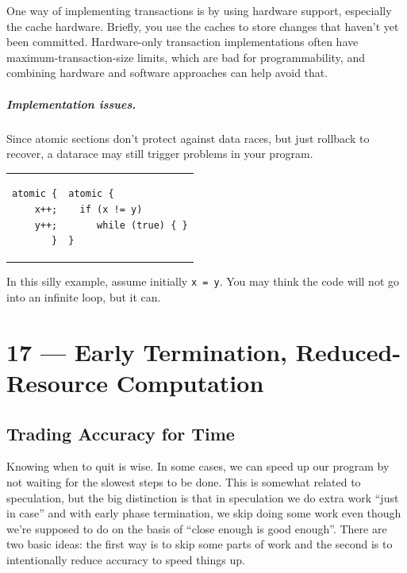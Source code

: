 \documentclass[a4paper]{report}
\begin{document}
One way of implementing transactions is by using hardware support,
especially the cache hardware. Briefly, you use the caches to store
changes that haven't yet been committed. Hardware-only transaction
implementations often have maximum-transaction-size limits, which are
bad for programmability, and combining hardware and software approaches
can help avoid that.

\paragraph{Implementation issues.} Since atomic sections don't protect
against data races, but just rollback to recover, a datarace may still
trigger problems in your program.

\begin{tabular}{r|l}
\hspace*{2em}  \begin{minipage}{.4\textwidth}
\begin{lstlisting}
atomic {
  x++;
  y++;
}
\end{lstlisting}
\end{minipage}
&
\hspace*{2em} \begin{minipage}{.4\textwidth}
\begin{lstlisting}
atomic {
  if (x != y)
     while (true) { }
}
\end{lstlisting}
\end{minipage}
\end{tabular}

In this silly example, assume initially {\tt x = y}. You may think the
code will not go into an infinite loop, but it can.










\chapter*{17 --- Early Termination, Reduced-Resource Computation}


\section*{Trading Accuracy for Time}

Knowing when to quit is wise. In some cases, we can speed up our program by not waiting for the slowest steps to be done. This is somewhat related to speculation, but the big distinction is that in speculation we do extra work ``just in case'' and with early phase termination, we skip doing some work even though we're supposed to do on the basis of ``close enough is good enough''.  There are two basic ideas: the first way is to skip some parts of work and the second is to intentionally reduce accuracy to speed things up. 
\end{document}
